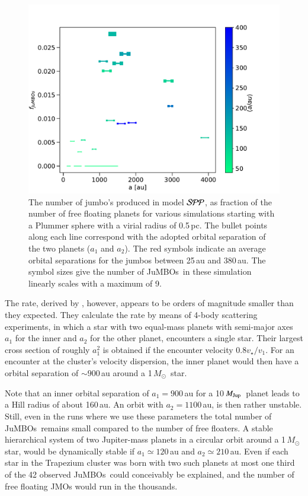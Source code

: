 \documentclass[submission,phys]{lib/SciPost}
\newcommand{\MSun}{\mbox{${M}_\odot$}}
\newcommand{\MJup}{\mbox{${M}_{\rm Jup}$}}
\newcommand{\jumbos}{\mbox{JuMBOs}}
\begin{document}
\begin{figure}
    \centering
        \includegraphics[width=.75\columnwidth]{figures/fig_fjumbos_from_psystems.pdf}
        \caption{The number of jumbo's produced in model ${\cal SPP}$,
          as fraction of the number of free floating planets for
          various simulations starting with a Plummer sphere with a
          virial radius of 0.5\,pc.  The bullet points along each line
          correspond with the adopted orbital separation of the two
          planets ($a_1$ and $a_2$).  The red symbols indicate an
          average orbital separations for the jumbos between 25\,au
          and 380\,au.  The symbol sizes give the number of \jumbos\,
          in these simulation linearly scales with a maximum of 9.  }
         \label{Fig:fjumbos_from_PP}
\end{figure}

The rate, derived by \cite{2023arXiv231006016W}, however, appears to
be orders of magnitude smaller than they expected.  They calculate the
rate by means of 4-body scattering experiments, in which a star with
two equal-mass planets with semi-major axes $a_1$ for the inner and
$a_2$ for the other planet, encounters a single star. Their largest
cross section of roughly $a_1^2$ is obtained if the encounter velocity
$0.8v_\star/v_1$. For an encounter at the cluster's velocity
dispersion, the inner planet would then have a orbital separation of
$\sim 900$\,au around a 1\,\MSun\, star.

Note that an inner orbital separation of $a_1=900$\,au for a
10\,\MJup\, planet leads to a Hill radius of about 160\,au. An orbit
with $a_2=1100$\,au, is then rather unstable.  Still, even in the runs
where we use these parameters the total number of \jumbos\, remains
small compared to the number of free floaters.  A stable hierarchical
system of two Jupiter-mass planets in a circular orbit around a
1\,\MSun\, star, would be dynamically stable if $a_1 \simeq 120$\,au
and $a_2 \simeq 210$\,au. Even if each star in the Trapezium cluster
was born with two such planets at most one third of the 42 observed
\jumbos\, could conceivably be explained, and the number of free
floating JMOs would run in the thousands.
\end{document}
